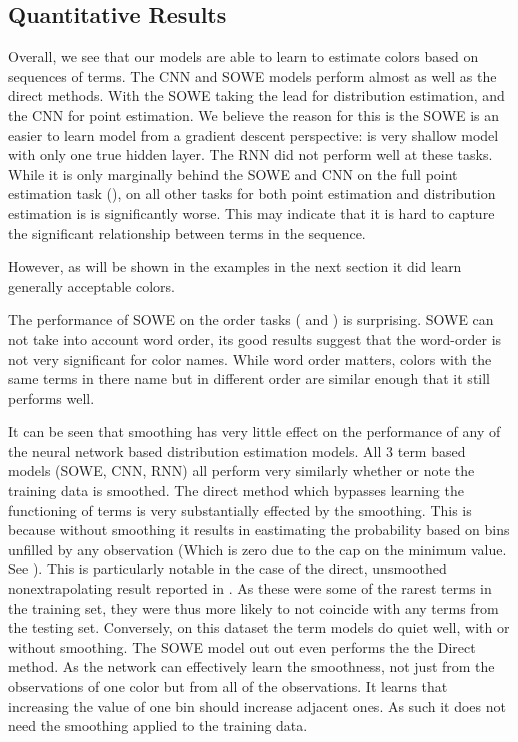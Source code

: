 \documentclass[11pt,a4paper]{article}
\begin{document}
	\clearpage


\subsection{Quantitative Results}\label{sec:quantitative-results}

Overall, we see that our models are able to learn to estimate colors based on sequences of terms.
The CNN and SOWE models perform almost as well as the direct methods.
With the SOWE taking the lead for distribution estimation, and the CNN for point estimation.
We believe the reason for this is the SOWE is an easier to learn model from a gradient descent perspective: is very shallow model with only one true hidden layer.
The RNN did not perform well at these tasks.
While it is only marginally behind the SOWE and CNN on the full point estimation task (), on all other tasks for both point estimation and distribution estimation is is significantly worse.
This may indicate that it is  hard to capture the significant relationship between terms in the sequence.

However, as will be shown in the examples in the next section it did learn generally acceptable colors.


The performance of SOWE on the order tasks ( and ) is surprising.
SOWE can not take into account word order, its good results suggest that the word-order is not very significant for color names.
While word order matters, colors with the same terms in there name but in different order are similar enough that it still performs well.



It can be seen that smoothing has very little effect on the performance of any of the neural network based distribution estimation models.
All 3 term based models (SOWE, CNN, RNN) all perform very similarly whether or note the training data is smoothed.
The direct method which bypasses learning the functioning of terms is very substantially effected by the smoothing.
This is because without smoothing it results in eastimating the probability based on bins unfilled by any observation (Which is zero due to the cap on the minimum value. See ).
This is particularly notable in the case of the direct, unsmoothed nonextrapolating result reported in . As these were some of the rarest terms in the training set, they were thus more likely to not coincide with any terms from the testing set.
Conversely, on this dataset the term models do quiet well, with or without smoothing. The SOWE model out out even performs the the Direct method.
As the network can effectively learn the smoothness, not just from the observations of one color but from all of the observations.
It learns that increasing the value of one bin should increase adjacent ones.
As such it does not need the smoothing applied to the training data.
\end{document}
